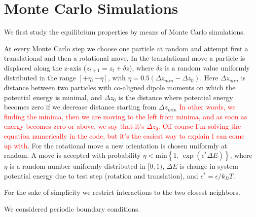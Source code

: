 \section{Monte Carlo Simulations}

We first study the equilibrium properties by means of Monte Carlo simulations.

At every Monte Carlo step we choose one particle at random and attempt first a translational and then a rotational move. In the translational move a particle is displaced along the z-axis ($z_{t+1} = z_t + \delta z$), where $\delta z$ is a random value uniformly distributed in the range $[+\eta, -\eta]$, with $\eta = 0.5 (\Delta z_{min} - \Delta z_0)$. Here $\Delta z_{min}$ is distance between two particles with co-aligned dipole moments on which the potential energy is minimal, and $\Delta z_0$ is the distance where potential energy becomes zero if we decrease distance starting from $\Delta z_{min}$ \textcolor{red}{In other words, we finding the minima, then we are moving to the left from minima, and as soon as energy becomes zero or above, we say that it's $\Delta z_0$. Off course I'm solving the equation numerically in the code, but it's the easiest way to explain I can come up with}. For the rotational move a new orientation is chosen uniformly at random. A move is accepted with probability $\eta < \mathrm{min} \left\{1, \, \exp(\epsilon^*\Delta E) \right\}$, where $\eta$ is a random number uniformly-distributed in $[0, 1)$, $\Delta E$ is change in system potential energy due to test step (rotation and translation), and $\epsilon^* = \epsilon/k_B T$.

For the sake of simplicity we restrict interactions to the two closest neighbors.

We considered periodic boundary conditions.